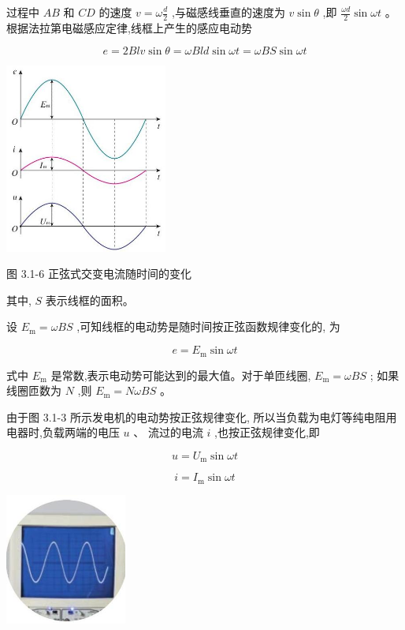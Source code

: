 \documentclass[10pt]{article}
\begin{document}
过程中 \({AB}\) 和 \({CD}\) 的速度 \(v = \omega \frac{d}{2}\) ,与磁感线垂直的速度为 \(v\sin \theta\) ,即 \(\frac{\omega d}{2}\sin {\omega t}\) 。根据法拉第电磁感应定律,线框上产生的感应电动势

\[
e = {2Blv}\sin \theta = {\omega Bld}\sin {\omega t} = {\omega BS}\sin {\omega t}
\]

\begin{center}
\includegraphics[max width=0.4\textwidth]{images/01910e72-c5b7-7ed5-a6d4-fb3a5faefc32_57_521196.jpg}
\end{center}

图 3.1-6 正弦式交变电流随时间的变化

其中, \(S\) 表示线框的面积。

设 \({E}_{\mathrm{m}} = {\omega BS}\) ,可知线框的电动势是随时间按正弦函数规律变化的, 为

\[
e = {E}_{\mathrm{m}}\sin {\omega t} \tag{1}
\]

式中 \({E}_{\mathrm{m}}\) 是常数,表示电动势可能达到的最大值。对于单匝线圈, \({E}_{\mathrm{m}} = {\omega BS}\) ; 如果线圈匝数为 \(N\) ,则 \({E}_{\mathrm{m}} = {N\omega BS}\) 。

由于图 3.1-3 所示发电机的电动势按正弦规律变化, 所以当负载为电灯等纯电阻用电器时,负载两端的电压 \(u\) 、 流过的电流 \(i\) ,也按正弦规律变化,即

\[
u = {U}_{\mathrm{m}}\sin {\omega t} \tag{2}
\]

\[
i = {I}_{\mathrm{m}}\sin {\omega t} \tag{3}
\]

\begin{center}
\includegraphics[max width=0.3\textwidth]{images/01910e72-c5b7-7ed5-a6d4-fb3a5faefc32_57_788908.jpg}
\end{center}
\end{document}
